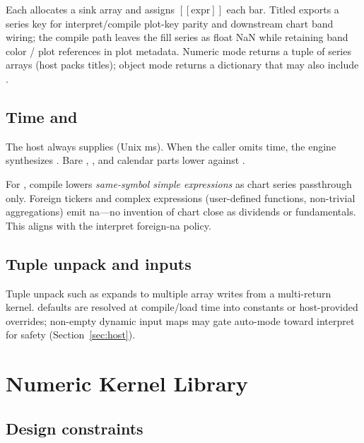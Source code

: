 \documentclass[11pt,a4paper]{article}
\renewcommand{\na}{\textsf{na}}
\providecommand{\llbracket}{[\![}
\providecommand{\rrbracket}{]\!]}
\begin{document}
Each  allocates a sink array and assigns
$\llbracket\mathrm{expr}\rrbracket$ each bar. Titled  exports a series key for interpret/compile plot-key parity and
downstream chart band wiring; the compile path leaves the fill series as
float NaN while retaining band color / plot references in plot metadata.
Numeric mode returns a tuple of series arrays (host packs titles); object
mode returns a dictionary that may also include .

\subsection{Time and }

The host always supplies  (Unix ms). When the caller omits
time, the engine synthesizes . Bare ,
, and calendar parts lower against .

For , compile lowers \emph{same-symbol simple \ohlcv{}
expressions} as chart series passthrough only. Foreign tickers and complex
expressions (user-defined functions, non-trivial aggregations) emit \na{}---no
invention of chart close as dividends or fundamentals. This aligns with the
interpret foreign-\na{} policy.

\subsection{Tuple unpack and inputs}

Tuple unpack such as  expands to multiple array
writes from a multi-return kernel.  defaults are resolved at
compile/load time into constants or host-provided overrides; non-empty dynamic
input maps may gate auto-mode toward interpret for safety
(Section~\ref{sec:host}).

\section{Numeric Kernel Library}
\label{sec:kernels}

\subsection{Design constraints}
\end{document}
